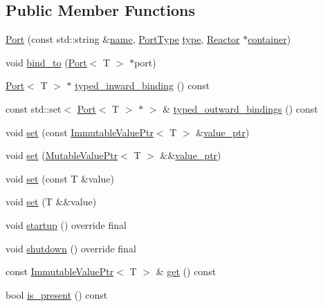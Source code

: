 \subsection*{Public Member Functions}
\begin{DoxyCompactItemize}
\item 
\hyperlink{classreactor_1_1Port_a5cd32eff95f2606d94adc482bf6944af}{Port} (const std\+::string \&\hyperlink{classreactor_1_1ReactorElement_a99579f61dbaf5d5d98aebfe26eb8bf77}{name}, \hyperlink{namespacereactor_a08c8e2d85e5bc706b1af8a87e40eec6d}{Port\+Type} \hyperlink{classreactor_1_1BasePort_a9af5e0d55ee1a425b2c5975ab1ca871e}{type}, \hyperlink{classreactor_1_1Reactor}{Reactor} $\ast$\hyperlink{classreactor_1_1ReactorElement_a25bf298de879a82eefc1ba426be05812}{container})
\item 
void \hyperlink{classreactor_1_1Port_a71e1c6fe14a7a6566bc5d5342fa9d16d}{bind\+\_\+to} (\hyperlink{classreactor_1_1Port}{Port}$<$ T $>$ $\ast$port)
\item 
\hyperlink{classreactor_1_1Port}{Port}$<$ T $>$ $\ast$ \hyperlink{classreactor_1_1Port_a22d0ef9cd82989e03a669aeccf8e694a}{typed\+\_\+inward\+\_\+binding} () const
\item 
const std\+::set$<$ \hyperlink{classreactor_1_1Port}{Port}$<$ T $>$ $\ast$ $>$ \& \hyperlink{classreactor_1_1Port_a4d3f681f3f3e0ef75988c3790eb24a17}{typed\+\_\+outward\+\_\+bindings} () const
\item 
void \hyperlink{classreactor_1_1Port_ac3d03f90b425a8656911ed3acf462a4d}{set} (const \hyperlink{classreactor_1_1ImmutableValuePtr}{Immutable\+Value\+Ptr}$<$ T $>$ \&\hyperlink{classreactor_1_1Port_adb40730eea54b529168a70cf8ed933c7}{value\+\_\+ptr})
\item 
void \hyperlink{classreactor_1_1Port_a041b16e47f5b67305ec215513ea92b23}{set} (\hyperlink{classreactor_1_1MutableValuePtr}{Mutable\+Value\+Ptr}$<$ T $>$ \&\&\hyperlink{classreactor_1_1Port_adb40730eea54b529168a70cf8ed933c7}{value\+\_\+ptr})
\item 
void \hyperlink{classreactor_1_1Port_ac75bc82e495f182037d5f7273fc75491}{set} (const T \&value)
\item 
void \hyperlink{classreactor_1_1Port_a9f742e8839c5061c21f890c1ca5fca6b}{set} (T \&\&value)
\item 
void \hyperlink{classreactor_1_1Port_ae182b2b10c53f2a21c424437dfc2b40e}{startup} () override final
\item 
void \hyperlink{classreactor_1_1Port_a3d440102c643fd98d17b4cf8714c910d}{shutdown} () override final
\item 
const \hyperlink{classreactor_1_1ImmutableValuePtr}{Immutable\+Value\+Ptr}$<$ T $>$ \& \hyperlink{classreactor_1_1Port_aac7650bcd4a119063858a0dddb5d58aa}{get} () const
\item 
bool \hyperlink{classreactor_1_1Port_ab4ab58fa62258a9e79b061ecd3f55946}{is\+\_\+present} () const
\end{DoxyCompactItemize}

